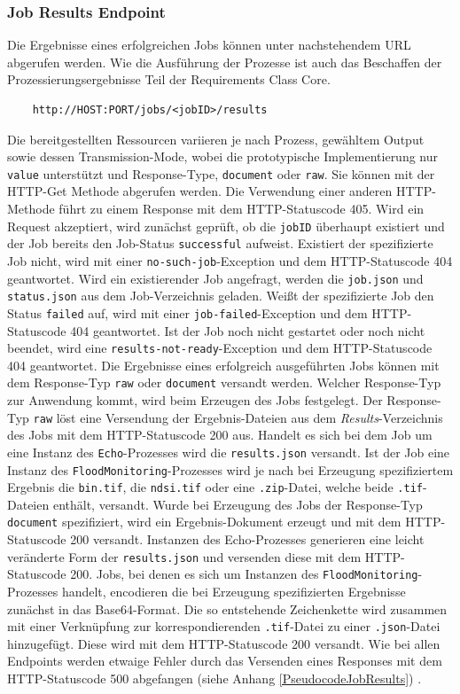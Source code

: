 \subsubsection{Job Results Endpoint}
Die Ergebnisse eines erfolgreichen Jobs können unter nachstehendem URL abgerufen werden. Wie die Ausführung der Prozesse ist auch das Beschaffen der 
Prozessierungsergebnisse Teil der Requirements Class Core.
\begin{center}
\begin{BVerbatim}
    http://HOST:PORT/jobs/<jobID>/results
\end{BVerbatim}
\end{center}
Die bereitgestellten Ressourcen variieren je nach Prozess, gewähltem Output sowie dessen Transmission-Mode, wobei die prototypische Implementierung nur \verb|value|
unterstützt und Response-Type, \verb|document| oder \verb|raw|. Sie können mit der HTTP-Get Methode abgerufen werden. Die Verwendung einer anderen 
HTTP-Methode führt zu einem Response mit dem HTTP-Statuscode 405.
Wird ein Request akzeptiert, wird zunächst geprüft, ob die \verb|jobID| überhaupt existiert und der Job bereits den Job-Status \verb|successful| aufweist. 
Existiert der spezifizierte Job nicht, wird mit einer \verb|no-such-job|-Exception und dem HTTP-Statuscode 404 geantwortet.
Wird ein existierender Job angefragt, werden die \verb|job.json| und \verb|status.json| aus dem Job-Verzeichnis geladen. 
Weißt der spezifizierte Job den Status \verb|failed| auf, wird mit einer \verb|job-failed|-Exception und dem HTTP-Statuscode 404 geantwortet. Ist der 
Job noch nicht gestartet oder noch nicht beendet, wird eine \verb|results-not-ready|-Exception und dem HTTP-Statuscode 404 geantwortet. 
Die Ergebnisse eines erfolgreich ausgeführten Jobs können mit dem Response-Typ \verb|raw| oder \verb|document| versandt werden. Welcher Response-Typ zur Anwendung 
kommt, wird beim Erzeugen des Jobs festgelegt. 
Der Response-Typ \verb|raw| löst eine Versendung der Ergebnis-Dateien aus dem \emph{Results}-Verzeichnis des Jobs mit dem HTTP-Statuscode 200 aus. 
Handelt es sich bei dem Job um eine Instanz des \verb|Echo|-Prozesses wird die \verb|results.json| versandt. 
Ist der Job eine Instanz des \verb|FloodMonitoring|-Prozesses wird je nach 
bei Erzeugung spezifiziertem Ergebnis die \verb|bin.tif|, die \verb|ndsi.tif| oder eine \verb|.zip|-Datei, welche beide \verb|.tif|-Dateien enthält, versandt. 
Wurde bei Erzeugung des Jobs der Response-Typ \verb|document| spezifiziert, wird ein Ergebnis-Dokument erzeugt und mit dem HTTP-Statuscode 200 versandt. 
Instanzen des Echo-Prozesses generieren eine leicht veränderte Form der \verb|results.json| und versenden diese mit dem HTTP-Statuscode 200.
Jobs, bei denen es sich um Instanzen des \verb|FloodMonitoring|-Prozesses handelt, encodieren die bei Erzeugung spezifizierten Ergebnisse zunächst in das Base64-Format. 
Die so entstehende Zeichenkette wird zusammen mit einer Verknüpfung zur korrespondierenden \verb|.tif|-Datei zu einer \verb|.json|-Datei hinzugefügt. 
Diese wird mit dem HTTP-Statuscode 200 versandt. 
Wie bei allen Endpoints werden etwaige Fehler durch das Versenden eines Responses mit dem HTTP-Statuscode 500 abgefangen (siehe Anhang \ref{PseudocodeJobResults}) 
\cite{code,ogc_api_processes_core}.

